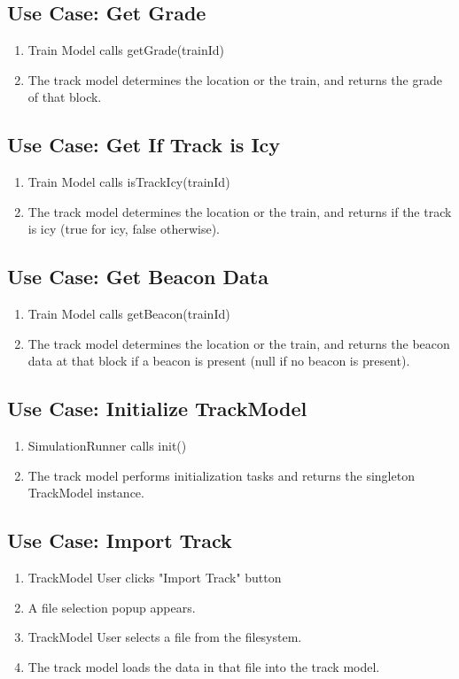 \documentclass{scrreprt}
\begin{document}
\subsection{Use Case: Get Grade}
\begin{enumerate}
	\item Train Model calls getGrade(trainId)
	\item The track model determines the location or the train, and returns the grade of that block.
\end{enumerate}

\subsection{Use Case: Get If Track is Icy}
\begin{enumerate}
	\item Train Model calls isTrackIcy(trainId)
	\item The track model determines the location or the train, and returns if the track is icy (true for icy, false otherwise).
\end{enumerate}

\subsection{Use Case: Get Beacon Data}
\begin{enumerate}
	\item Train Model calls getBeacon(trainId)
	\item The track model determines the location or the train, and returns the beacon data at that block if a beacon is present (null if no beacon is present).
\end{enumerate}

\subsection{Use Case: Initialize TrackModel}
\begin{enumerate}
	\item SimulationRunner calls init()
	\item The track model performs initialization tasks and returns the singleton TrackModel instance.
\end{enumerate}

\subsection{Use Case: Import Track}
\begin{enumerate}
	\item TrackModel User clicks "Import Track" button
	\item A file selection popup appears.
	\item TrackModel User selects a file from the filesystem.
	\item The track model loads the data in that file into the track model.
\end{enumerate}
\end{document}
